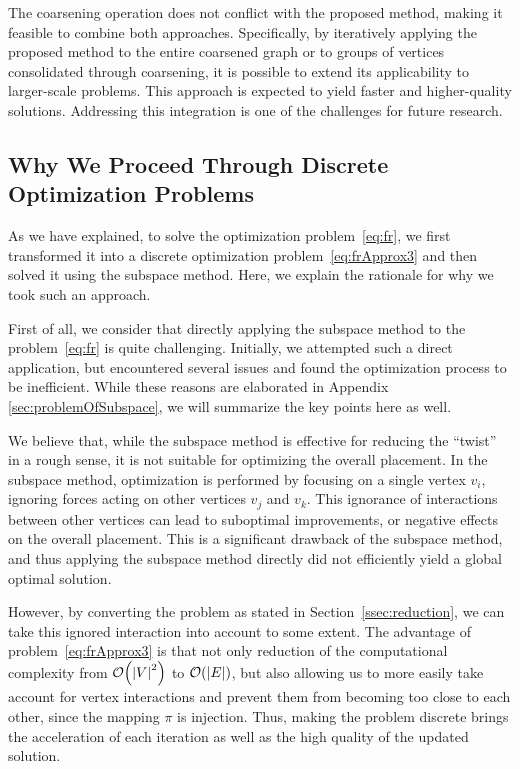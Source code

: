 \documentclass[dvipdfmx,journal]{IEEEtran}
\begin{document}
The coarsening operation does not conflict with the proposed method, making it feasible to combine both approaches.
Specifically, by iteratively applying the proposed method to the entire coarsened graph or to groups of vertices consolidated through coarsening, it is possible to extend its applicability to larger-scale problems.
This approach is expected to yield faster and higher-quality solutions.
Addressing this integration is one of the challenges for future research.

\subsection{Why We Proceed Through Discrete Optimization Problems}\label{sec:whyDiscrete}

As we have explained, to solve the optimization problem~\eqref{eq:fr}, we first transformed it into a discrete optimization problem~\eqref{eq:frApprox3} and then solved it using the subspace method.
Here, we explain the rationale for why we took such an approach.

First of all, we consider that directly applying the subspace method to the problem~\eqref{eq:fr} is quite challenging.
Initially, we attempted such a direct application, but encountered several issues and found the optimization process to be inefficient.
While these reasons are elaborated in Appendix \ref{sec:problemOfSubspace}, we will summarize the key points here as well.

We believe that, while the subspace method is effective for reducing the ``twist'' in a rough sense, it is not suitable for optimizing the overall placement.
In the subspace method, optimization is performed by focusing on a single vertex $v_i$, ignoring forces acting on other vertices $v_j$ and $v_k$.
This ignorance of interactions between other vertices can lead to suboptimal improvements, or negative effects on the overall placement.
This is a significant drawback of the subspace method, and thus applying the subspace method directly did not efficiently yield a global optimal solution.

However, by converting the problem as stated in Section~\ref{ssec:reduction}, we can take this ignored interaction into account to some extent.
The advantage of problem~\eqref{eq:frApprox3} is that not only reduction of the computational complexity from $\order{\abs{V}^2}$ to $\order{\abs{E}}$, but also allowing us to more easily take account for vertex interactions and prevent them from becoming too close to each other, since the mapping $\pi$ is injection.
Thus, making the problem discrete brings the acceleration of each iteration as well as the high quality of the updated solution.
\end{document}
